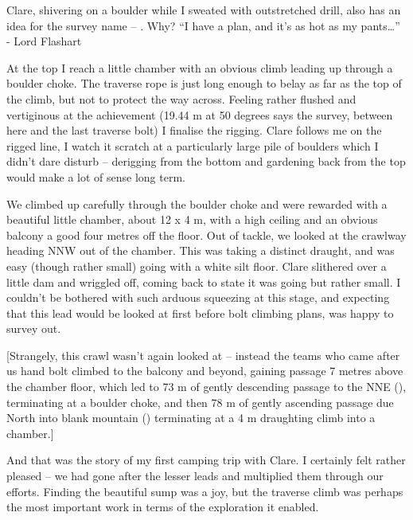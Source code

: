 Clare, shivering on a boulder while I sweated with outstretched drill,
also has an idea for the survey name -- . Why? ``I have a plan,
and it's as hot as my pants\ldots{}'' - Lord Flashart

At the top I reach a little chamber with an obvious climb leading up
through a boulder choke. The traverse rope is just long enough to belay
as far as the top of the climb, but not to protect the way across.
Feeling rather flushed and vertiginous at the achievement (19.44 m at 50
degrees says the survey, between here and the last traverse bolt) I
finalise the rigging. Clare follows me on the rigged line, I watch it
scratch at a particularly large pile of boulders which I didn't dare
disturb -- derigging from the bottom and gardening back from the top
would make a lot of sense long term.

We climbed up carefully through the boulder choke and were rewarded with
a beautiful little chamber, about 12 x 4 m, with a high ceiling and an
obvious balcony a good four metres off the floor. Out of tackle, we looked
at the crawlway heading NNW out of the chamber. This was taking a
distinct draught, and was easy (though rather small) going with a white
silt floor. Clare slithered over a little dam and wriggled off, coming
back to state it was going but rather small. I couldn't be bothered with
such arduous squeezing at this stage, and expecting that this lead would
be looked at first before bolt climbing plans, was happy to survey out.

[Strangely, this crawl wasn't again looked at -- instead the teams who
came after us hand bolt climbed to the balcony and beyond, gaining
passage 7 metres above the chamber floor, which led to 73 m of gently
descending passage to the NNE (), terminating at a boulder
choke, and then 78 m of gently ascending passage due North into blank
mountain () terminating at a 4 m draughting climb
into a chamber.]



And that was the story of my first camping trip with Clare. I certainly
felt rather pleased -- we had gone after the lesser leads and multiplied
them through our efforts. Finding the beautiful 
sump was a joy, but the  traverse climb was perhaps the most
important work in terms of the exploration it enabled.

